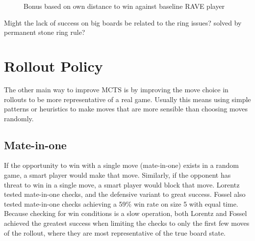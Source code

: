 \begin{figure}
	\centering
{}
	\caption{Bonus based on own distance to win against baseline RAVE player}
	\label{fig:distancesides}
\end{figure}


Might the lack of success on big boards be related to the ring issues? solved by permanent stone ring rule?


\section{Rollout Policy}

The other main way to improve MCTS is by improving the move choice in rollouts to be more representative of a real game. Usually this means using simple patterns or heuristics to make moves that are more sensible than choosing moves randomly.

\subsection{Mate-in-one}

If the opportunity to win with a single move (mate-in-one) exists in a random game, a smart player would make that move. Similarly, if the opponent has threat to win in a single move, a smart player would block that move. Lorentz tested mate-in-one checks, and the defensive variant to great success. Fossel also tested mate-in-one checks achieving a 59\% win rate on size 5 with equal time\cite{fossel2010monte}. Because checking for win conditions is a slow operation, both Lorentz and Fossel achieved the greatest success when limiting the checks to only the first few moves of the rollout, where they are most representative of the true board state.

